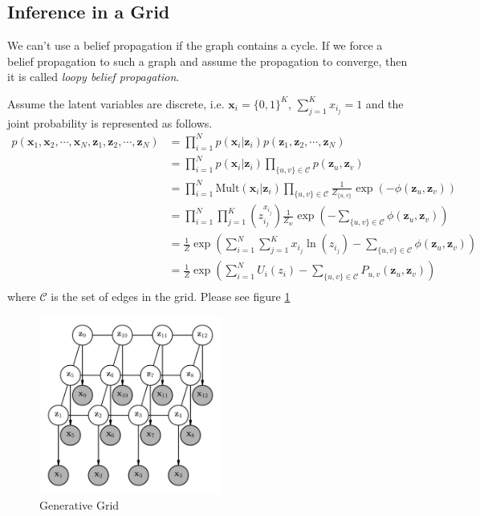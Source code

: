 \documentclass[a4]{article}
\begin{document}
\subsection{Inference in a Grid}
We can't use a belief propagation if the graph contains a cycle.
If we force a belief propagation to such a graph and assume the propagation to converge,
then it is called \textit{loopy belief propagation}.

Assume the latent variables are discrete, i.e. $\bm{x}_i = \{0,1\}^K$, $\sum_{j=1}^K x_{i_j} = 1$
and the joint probability is represented as follows.
\begin{equation}
\begin{aligned}
    p(\bm{x}_1, \bm{x}_2, \cdots, \bm{x}_N, \bm{z}_1, \bm{z}_2, \cdots, \bm{z}_N)
&= 
    \prod_{i=1}^N p(\bm{x}_i|\bm{z}_i) p(\bm{z}_1, \bm{z}_2, \cdots, \bm{z}_N)\\
&= 
    \prod_{i=1}^N p(\bm{x}_i|\bm{z}_i) \prod_{\{u,v\}\in \mathcal{C}} p(\bm{z}_u, \bm{z}_v)\\
&= 
    \prod_{i=1}^N \text{Mult}(\bm{x}_i|\bm{z}_i) 
    \prod_{\{u,v\}\in \mathcal{C}} \frac{1}{Z_{\{u,v\}}}\exp\left(-\phi\left(\bm{z}_u, \bm{z}_v\right)\right)\\
&= 
    \prod_{i=1}^N \prod_{j=1}^K (z_{i_j}^{x_{i_j}})
    \frac{1}{Z_w}\exp\left( - \sum_{\{u,v\}\in \mathcal{C}} \phi\left(\bm{z}_u, \bm{z}_v\right)\right)\\
&= 
    \frac{1}{Z}\exp\left(
    \sum_{i=1}^N \sum_{j=1}^K x_{i_j}\ln({z_{i_j}})
     - \sum_{\{u,v\}\in \mathcal{C}} \phi\left(\bm{z}_u, \bm{z}_v\right)\right)\\
&= 
    \frac{1}{Z}\exp\left(
    \sum_{i=1}^N U_i(z_i)
     - \sum_{\{u,v\}\in \mathcal{C}} P_{u,v}\left(\bm{z}_u, \bm{z}_v\right)\right)\\
\end{aligned}
\end{equation}
where $\mathcal{C}$ is the set of edges in the grid.
Please see figure \ref{fig:grid_generative}
\begin{figure}[!htb]
\centering
\includegraphics[width=6cm]{grid_generative.png}
\caption{Generative Grid}
\label{fig:grid_generative}
\end{figure}
\end{document}
